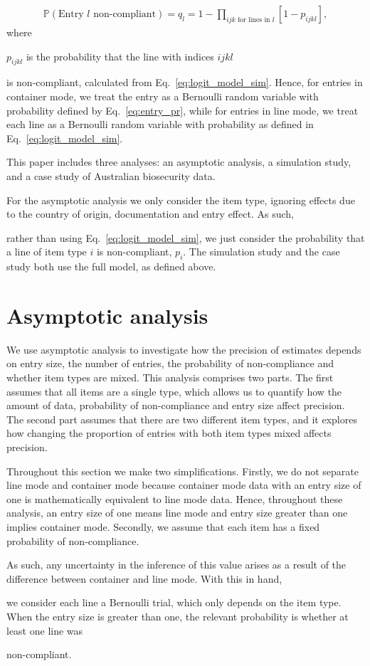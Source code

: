 \documentclass{article}
\newif\ifproofread
\newcommand{\rev}[1]{%
\ifproofread
\hl{#1}%
\else
#1%
\fi
}
\begin{document}
\begin{align}
\mathbb{P}\left(\text{Entry } l \text{ non-compliant}\right) = q_l = 1-\prod_{ijk \text{ for lines in }l}[1-p_{ijkl}],\label{eq:entry_pr}
\end{align}
where \rev{$p_{ijkl}$ is the probability that the line with indices $ijkl$} is non-compliant, calculated from Eq.~\eqref{eq:logit_model_sim}.
Hence, for entries in container mode, we treat the entry  as a Bernoulli random variable with probability defined by Eq.~\eqref{eq:entry_pr}, while for entries in line mode, we treat each line as a Bernoulli random variable with probability as defined in Eq.~\eqref{eq:logit_model_sim}.


This paper includes three analyses: an asymptotic analysis,
 a simulation study, and a case study of Australian biosecurity data. \rev{For the asymptotic analysis we only consider the item type, ignoring effects due to the country of origin, documentation and entry effect. As such,} rather than using Eq.~\eqref{eq:logit_model_sim}, we just consider the probability that a line of item type \(i\) is non-compliant, \(p_i\). The simulation study and the case study both use the full model, as defined above. 

\section{Asymptotic analysis}\label{sec:asymptotic_analysis}
We use asymptotic analysis to investigate how the precision of estimates depends on entry size, the number of entries, the probability of non-compliance and whether item types are mixed. This analysis comprises two parts. The first assumes that all items are a single type, which allows us to quantify how the amount of data, probability of non-compliance  and entry size affect precision. The second part assumes that there are two different item types, and it explores how changing the proportion of entries with both item types mixed affects precision.

Throughout this section we make two simplifications. Firstly, we do not separate line mode and container mode because container mode data with an entry size of one is mathematically equivalent to line mode data. Hence, throughout these analysis, an entry size of one means line mode and entry size greater than one implies container mode. Secondly, we  assume that each item has a fixed probability of non-compliance. \rev{As such, any uncertainty in the inference of this value arises as a result of the difference between container and line mode. With this in hand,} we consider each line a Bernoulli trial, which only depends on the item type. When the entry size is greater than one, the relevant probability is whether at least one line was \rev{non-compliant.}
\end{document}
